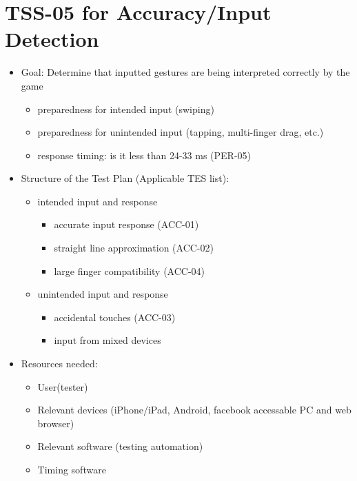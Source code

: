 \section{TSS-05 for Accuracy/Input Detection}
\begin{itemize}
\item Goal: Determine that inputted gestures are being interpreted correctly by the game
\begin{itemize}
\item preparedness for intended input (swiping)
\item preparedness for unintended input (tapping, multi-finger drag, etc.)
\item response timing: is it less than 24-33 ms (PER-05)
\end{itemize}

\item Structure of the Test Plan (Applicable TES list):
\begin{itemize}
\item intended input and response
\begin{itemize}
\item accurate input response (ACC-01)
\item straight line approximation (ACC-02)
\item large finger compatibility (ACC-04)
\end{itemize}

\item unintended input and response
\begin{itemize}
\item accidental touches (ACC-03)
\item input from mixed devices
\end{itemize}
\end{itemize}

\item Resources needed:
\begin{itemize}
\item User(tester)
\item Relevant devices (iPhone/iPad, Android, facebook accessable PC and web browser)
\item Relevant software (testing automation)
\item Timing software
\end{itemize}
\end{itemize}


